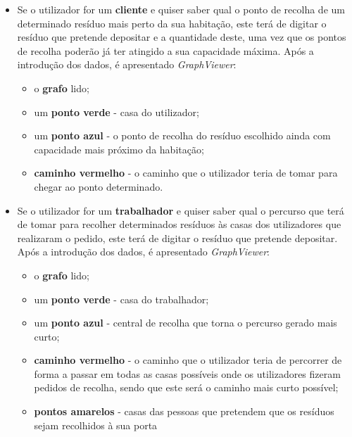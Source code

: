 \documentclass[article, a4paper, 12pt, oneside]{memoir}
\begin{document}
\begin{itemize}
	\item Se o utilizador for um \textbf{cliente} e quiser saber qual o ponto de recolha de um determinado resíduo mais perto da sua habitação, este terá de digitar o resíduo que pretende depositar e a quantidade deste, uma vez que os pontos de recolha poderão já ter atingido a sua capacidade máxima. Após a introdução dos dados, é apresentado \textit{GraphViewer}:
	\begin{itemize}
		\item o \textbf{grafo} lido;
		\item um \textbf{ponto verde} - casa do utilizador;
		\item um \textbf{ponto azul} - o ponto de recolha do resíduo escolhido ainda com capacidade mais próximo da habitação;
		\item \textbf{caminho vermelho} - o caminho que o utilizador teria de tomar para chegar ao ponto determinado. 
	\end{itemize}

	
	\item Se o utilizador for um \textbf{trabalhador} e quiser saber qual o percurso que terá de tomar para recolher determinados resíduos às casas dos utilizadores que realizaram o pedido, este terá de digitar o resíduo que pretende depositar. Após a introdução dos dados, é apresentado \textit{GraphViewer}:
	\begin{itemize}
		\item o \textbf{grafo} lido;
		\item um \textbf{ponto verde} - casa do trabalhador;
		\item um \textbf{ponto azul} - central de recolha que torna o percurso gerado mais curto;
		\item \textbf{caminho vermelho} - o caminho que o utilizador teria de percorrer de forma a passar em todas as casas possíveis onde os utilizadores fizeram pedidos de recolha, sendo que este será o caminho mais curto possível;
		\item \textbf{pontos amarelos} - casas das pessoas que pretendem que os resíduos sejam recolhidos à sua porta		
	\end{itemize}
	

\end{itemize}
\end{document}
